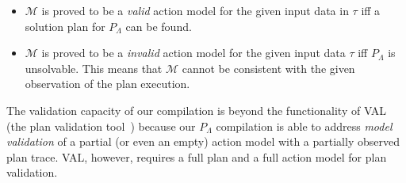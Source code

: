 \begin{itemize}
	\item $\mathcal{M}$ is proved to be a {\em valid} action model for the given input data in $\tau$ iff a solution plan for $P_{\Lambda}$ can be found.
	\item $\mathcal{M}$ is proved to be a {\em invalid} action model for the given input data $\tau$ iff $P_{\Lambda}$ is unsolvable. This means that $\mathcal{M}$ cannot be consistent with the given observation of the plan execution.
\end{itemize}


The validation capacity of our compilation is beyond the functionality of VAL (the plan validation tool~\cite{howey2004val}) because our $P_{\Lambda}$ compilation is able to address {\em model validation} of a partial (or even an empty) action model with a partially observed plan trace. VAL, however, requires a full plan and a full action model for plan validation.



